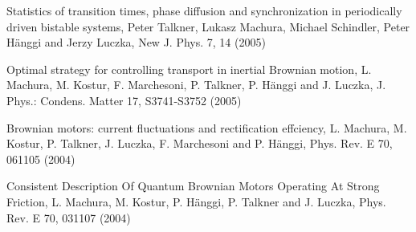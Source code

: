 \begin{etaremune}
\item Statistics of transition times, phase diffusion and synchronization in periodically driven bistable systems, Peter Talkner, Lukasz Machura, Michael Schindler, Peter Hänggi and Jerzy Luczka, New J. Phys. 7,  14 (2005)

\item Optimal strategy for controlling transport in inertial Brownian motion, L. Machura, M. Kostur, F. Marchesoni, P. Talkner, P. Hänggi and J. Luczka, J. Phys.: Condens. Matter 17,  S3741-S3752 (2005)

\item Brownian motors: current fluctuations and rectification effciency, L. Machura, M. Kostur, P. Talkner, J. Luczka, F. Marchesoni and P. Hänggi, Phys. Rev. E 70,  061105 (2004)

\item Consistent Description Of Quantum Brownian Motors Operating At Strong Friction, L. Machura, M. Kostur, P. Hänggi, P. Talkner and J. Luczka, Phys. Rev. E 70,  031107 (2004)

\end{etaremune}